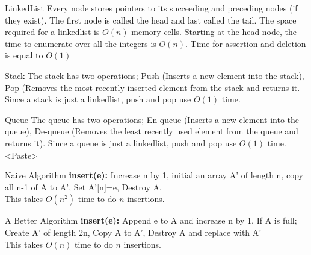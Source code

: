 \documentclass{lecture}
\begin{document}
\begin{landscape}
\begin{multicols}{2}
    \begin{note}{LinkedList}
        Every node stores pointers to its succeeding and preceding nodes (if they exist). The first node is called the head and last called the tail. The space required for a linkedlist is $O(n)$ memory cells. Starting at the head node, the time to enumerate over all the integers is $O(n)$. Time for assertion and deletion is equal to $O(1)$
    \end{note}
    \vfill
    \begin{note}{Stack}
        The stack has two operations; Push (Inserts a new element into the stack), Pop (Removes the most recently inserted element from the stack and returns it. Since a stack is just a linkedlist, push and pop use $O(1)$ time.
    \end{note}
    \vfill
    \begin{note}{Queue}
		The queue has two operations; En-queue (Inserts a new element into the queue), De-queue (Removes the least recently used element from the queue and returns it). Since a queue is just a linkedlist, push and pop use $O(1)$ time.<Paste>
    \end{note}
    \vfill

    \begin{note}{Naive Algorithm}
        \textbf{insert(e):} Increase n by 1, initial an array A' of length n, copy all n-1 of A to A', Set A'[n]=e, Destroy A.\\
        This takes $O(n^2)$ time to do $n$ insertions.
    \end{note}
    \vfill
    \begin{note}{A Better Algorithm}
        \textbf{insert(e):} Append e to A and increase n by 1. If A is full; Create A' of length 2n, Copy A to A', Destroy A and replace with A'\\
        This takes $O(n)$ time to do $n$ insertions.
    \end{note}
    \vfill


\end{multicols}
\end{landscape}
\end{document}
